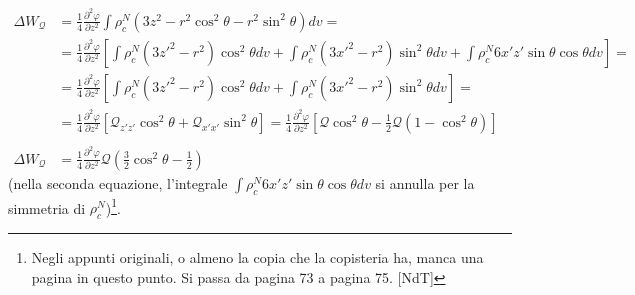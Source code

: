 \begin{equation}
\begin{split}
\Delta W_{\mathcal{Q}} &= \frac{1}{4} \frac{\partial^2 \varphi}{\partial z^2} 
\int \rho_c^N \left( 3 z^2 - r^2 \cos^2 \theta - r^2 \sin^2 \theta \right) dv 
=\\
&= \frac{1}{4} \frac{\partial^2 \varphi}{\partial z^2} \left[ \int \rho_c^N 
\left( 3 z'^2 - r^2 \right) \cos^2 \theta dv + \int \rho_c^N \left( 3 x'^2 - 
r^2 \right) \sin^2 \theta dv + \int \rho_c^N 6 x'z' \sin \theta \cos \theta dv 
\right] =\\
&= \frac{1}{4} \frac{\partial^2 \varphi}{\partial z^2} \left[ \int \rho_c^N 
\left( 3 z'^2 - r^2 \right) \cos^2 \theta dv + \int \rho_c^N \left( 3 x'^2 - 
r^2 \right) \sin^2 \theta dv \right] =\\
&= \frac{1}{4} \frac{\partial^2 \varphi}{\partial z^2} \left[ \mathcal{Q}_{z' 
z'} \cos^2 \theta + \mathcal{Q}_{x' x'} \sin^2 \theta \right] = \frac{1}{4} 
\frac{\partial^2 \varphi}{\partial z^2} \left[ \mathcal{Q} \cos^2 \theta - 
\frac{1}{2} \mathcal{Q}(1 - \cos^2 \theta) \right]\\
\\
\Delta W_{\mathcal{Q}} &= \frac{1}{4} \frac{\partial^2 \varphi}{\partial z^2} 
\mathcal{Q} \left( \frac{3}{2} \cos^2 \theta - \frac{1}{2} \right) 
\end{split}
\end{equation}
(nella seconda equazione, l'integrale $\int \rho_c^N 6 x'z' \sin \theta \cos
\theta dv$ si annulla per la simmetria di $\rho_c^N$)\footnote{Negli appunti
  originali, o almeno la copia che la copisteria ha, manca una pagina in questo
punto. Si passa da pagina 73 a pagina 75. [NdT]}.

